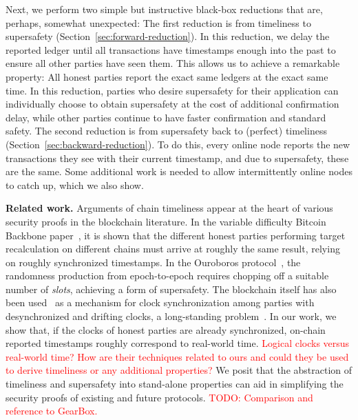 Next, we perform two simple but instructive black-box reductions that are, perhaps, somewhat unexpected:
The first reduction is from timeliness to supersafety (Section~\ref{sec:forward-reduction}).
In this reduction, we delay the reported ledger until all
transactions have timestamps enough into the past to ensure all other parties have seen them.
This allows us to achieve a remarkable property: All honest parties report the
exact same ledgers at the exact same time.
In this reduction, parties who desire supersafety for their application can individually choose to obtain supersafety at the cost of additional confirmation delay, while other parties continue to have faster confirmation and standard safety. 
The second reduction is from supersafety back to (perfect) timeliness (Section~\ref{sec:backward-reduction}).
To do this, every online node reports the new transactions they see with
their current timestamp, and due to supersafety, these are the same.
Some additional work is needed to allow intermittently online nodes to catch up, which we also show.

\noindent
\textbf{Related work.}
Arguments of chain timeliness appear at the heart of various security proofs
in the blockchain literature.
In the variable difficulty Bitcoin Backbone paper~\cite{varbackbone},
it is shown that the different honest parties performing target recalculation on different chains
must arrive at roughly the same result, relying on roughly synchronized timestamps.
In the Ouroboros protocol~\cite{ouroboros},
the randomness production from epoch-to-epoch requires chopping off a suitable number of \emph{slots},
achieving a form of supersafety. The blockchain itself has also been used~\cite{klepsydra,chronos}
as a mechanism for clock synchronization among parties with desynchronized and drifting clocks,
a long-standing problem~\cite{lamport-synchronizing-clocks}.
In our work, we show that, if the clocks of honest parties are already synchronized,
on-chain reported timestamps roughly correspond to real-world time.
\textcolor{red}{Logical clocks versus real-world time? How are their techniques related to ours and could they be used to derive timeliness or any additional properties?}
We posit that the abstraction of timeliness and supersafety
into stand-alone properties can aid in simplifying the security proofs
of existing and future protocols.
\textcolor{red}{TODO: Comparison and reference to GearBox.}

